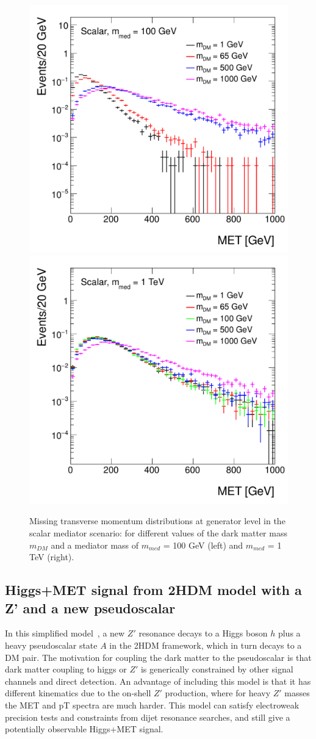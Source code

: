 \begin{figure}[hbpt!]
	\begin{center}
		\includegraphics[width=0.49\linewidth]{figures/EW/monoH/scalar_100_MET_et_Log}
		\includegraphics[width=0.49\linewidth]{figures/EW/monoH/scalar_1000_MET_et_Log}
		\caption{Missing transverse momentum distributions at generator level in the scalar 
			mediator scenario: for different values of the dark matter mass $m_{DM}$ 
			and a mediator mass of $m_{med}$ = 100 GeV (left) and $m_{med}$ = 1 TeV (right).
			\label{fig:metScalarMass}}
	\end{center}
\end{figure}


\subsection{Higgs+MET signal from 2HDM model with a Z' and a new pseudoscalar}

In this simplified model~\cite{Berlin:2014cfa}, a new $Z'$ resonance decays to a Higgs boson $h$ 
plus a heavy pseudoscalar state 
$A$ in the 2HDM framework, which in turn decays to a DM pair. 
The motivation for coupling the dark matter to the pseudoscalar is that dark matter coupling to higgs or $Z'$ is generically 
constrained by other signal channels and direct detection. 
An advantage of including this model is that it has different kinematics  due to the on-shell $Z'$ production, 
where for heavy $Z'$ masses the MET and pT spectra are much harder.
This model can satisfy electroweak precision tests and constraints from dijet resonance searches, 
and still give a potentially observable Higgs+MET signal.
 
